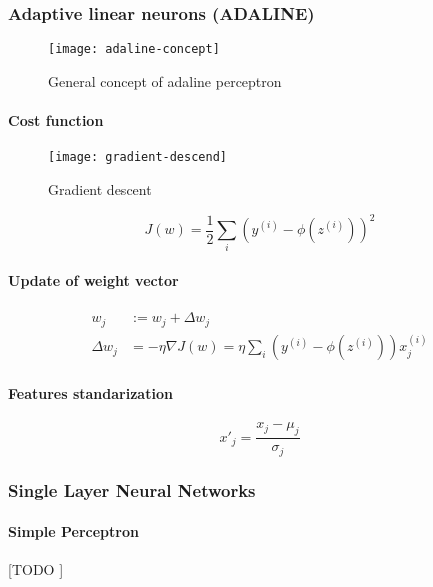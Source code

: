 \documentclass{article}
\begin{document}
			\subsubsection{Adaptive linear neurons (ADALINE)}

			\begin{figure}
				\centering
				\texttt{[image: adaline-concept]}
				\caption{General concept of adaline perceptron}
				\label{fig:adaline-concept}
			\end{figure}

			\paragraph{Cost function}

			\begin{figure}
				\centering
				\texttt{[image: gradient-descend]}
				\caption{Gradient descent}
				\label{fig:gradient-descend}
			\end{figure}

			\begin{equation*}
				J(w) = \frac{1}{2} \sum_i (y^{(i)}-\phi(z^{(i)}))^2
			\end{equation*}

			\paragraph{Update of weight vector}

			\begin{align*}
					w_j &:= w_j + \Delta w_j \\
					\Delta w_j &= -\eta\nabla J(w) = \eta\sum_i (y^{(i)} -\phi(z^{(i)}))x^{(i)}_j
			\end{align*}

			\paragraph{Features standarization}

			\begin{equation*}
				x'_j = \frac{x_j - \mu_j}{\sigma_j}
			\end{equation*}


			\subsubsection{Single Layer Neural Networks}
			\label{sec:single-layer-nn}


				\paragraph{Simple Perceptron}
				\label{sec:perceptron}
				[TODO ]
\end{document}
